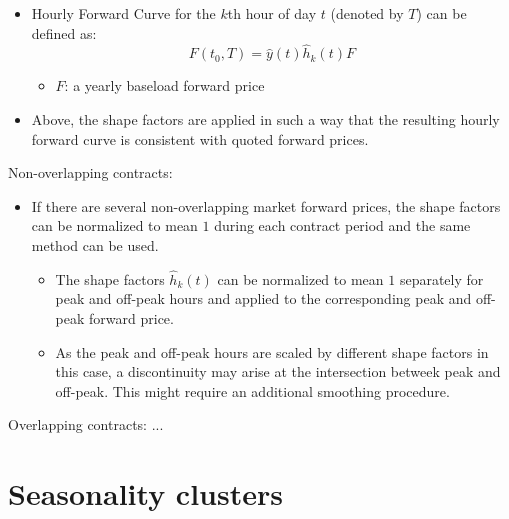 \documentclass{beamer}
\begin{document}
\begin{frame}
    \begin{itemize}
        \item Hourly Forward Curve for the $k$th hour of day $t$ (denoted by $T$) can be defined as:
              \[
                  F(t_0, T) = \hat y(t) \hat h_k(t) F
              \]
              \begin{itemize}
                  \item $F$: a yearly baseload forward price
              \end{itemize}

        \item Above, the shape factors are applied in such a way that the resulting hourly forward curve is consistent with quoted forward prices.
    \end{itemize}
\end{frame}


\begin{frame}
    Non-overlapping contracts:
    \begin{itemize}
        \item If there are several non-overlapping market forward prices, the shape factors can be normalized to mean $1$ during each contract period and the same method can be used.

              \begin{itemize}
                  \item The shape factors $\hat h_k(t)$ can be normalized to mean $1$ separately for peak and off-peak hours and applied to the corresponding peak and off-peak forward price.

                  \item As the peak and off-peak hours are scaled by different shape factors in this case, a discontinuity may arise at the intersection betweek peak and off-peak. This might require an additional smoothing procedure.
              \end{itemize}
    \end{itemize}
\end{frame}


\begin{frame}
    Overlapping contracts: ...
\end{frame}



\section{Seasonality clusters}
\end{document}
